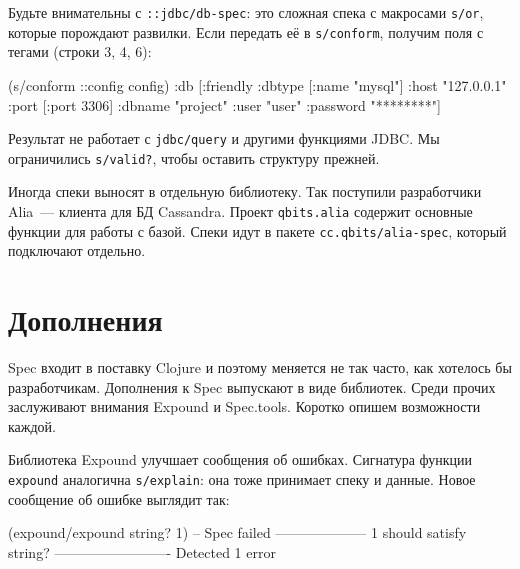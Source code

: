 \label{jdbc-conform-warning}


Будьте внимательны с \verb|::jdbc/db-spec|: это сложная спека с макросами
\verb|s/or|, которые порождают развилки. Если передать её в
\verb|s/conform|, получим поля с тегами (строки 3, 4, 6):

\begin{english}
  \begin{clojure/lines}
(s/conform ::config config)
{:db
 [:friendly
  {:dbtype   [:name "mysql"]
   :host     "127.0.0.1"
   :port     [:port 3306]
   :dbname   "project"
   :user     "user"
   :password "********"}]}
  \end{clojure/lines}
\end{english}

Результат не работает с \verb|jdbc/query| и другими функциями JDBC. Мы
ограничились \verb|s/valid?|, чтобы оставить структуру прежней.


Иногда спеки выносят в отдельную библиотеку. Так поступили разработчики
Alia~--- клиента для БД
Cassandra. Проект \verb|qbits.alia| содержит основные функции для работы с
базой. Спеки идут в пакете \verb|cc.qbits/alia-spec|, который подключают
отдельно.

\section{Дополнения}

Spec входит в поставку Clojure и поэтому меняется не так часто, как хотелось бы
разработчикам. Дополнения к Spec выпускают в виде библиотек. Среди прочих
заслуживают внимания Expound и Spec.tools. Коротко опишем возможности каждой.


Библиотека Expound улучшает сообщения об
ошибках. Сигнатура функции \verb|expound| аналогична \verb|s/explain|: она
тоже принимает спеку и данные. Новое сообщение об ошибке выглядит так:


\begin{english}
  \begin{clojure}
(expound/expound string? 1)
-- Spec failed --------------------
  1
should satisfy
  string?
-------------------------
Detected 1 error
  \end{clojure}
\end{english}

